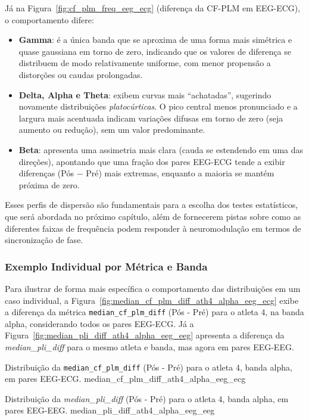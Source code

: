 Já na Figura~\ref{fig:cf_plm_freq_eeg_ecg} (diferença da CF-PLM em EEG-ECG), o comportamento difere:
\begin{itemize}
    \item \textbf{Gamma}: é a única banda que se aproxima de uma forma mais simétrica e quase gaussiana em torno de zero, indicando que os valores de diferença se distribuem de modo relativamente uniforme, com menor propensão a distorções ou caudas prolongadas.
    \item \textbf{Delta, Alpha e Theta}: exibem curvas mais ``achatadas'', sugerindo novamente distribuições \emph{platocúrticas}. O pico central menos pronunciado e a largura mais acentuada indicam variações difusas em torno de zero (seja aumento ou redução), sem um valor predominante.
    \item \textbf{Beta}: apresenta uma assimetria mais clara (cauda se estendendo em uma das direções), apontando que uma fração dos pares EEG-ECG tende a exibir diferenças (Pós $-$ Pré) mais extremas, enquanto a maioria se mantém próxima de zero.
\end{itemize}

Esses perfis de dispersão são fundamentais para a escolha dos testes estatísticos, que será abordada no próximo capítulo, além de fornecerem pistas sobre como as diferentes faixas de frequência podem responder à neuromodulação em termos de sincronização de fase.

\subsubsection{Exemplo Individual por Métrica e Banda}
Para ilustrar de forma mais específica o comportamento das distribuições em um caso individual, a Figura~\ref{fig:median_cf_plm_diff_ath4_alpha_eeg_ecg} exibe a diferença da métrica \texttt{median\_cf\_plm\_diff} (Pós - Pré) para o atleta 4, na banda alpha, considerando todos os pares EEG-ECG. Já a Figura~\ref{fig:median_pli_diff_ath4_alpha_eeg_eeg} apresenta a diferença da \textit{median\_pli\_diff} para o mesmo atleta e banda, mas agora em pares EEG-EEG.

{Distribuição da \texttt{median\_cf\_plm\_diff} (Pós - Pré) para o atleta 4, banda alpha, em pares EEG-ECG.}
{median_cf_plm_diff_ath4_alpha_eeg_ecg}

{Distribuição da \textit{median\_pli\_diff} (Pós - Pré) para o atleta 4, banda alpha, em pares EEG-EEG.}
{median_pli_diff_ath4_alpha_eeg_eeg}

